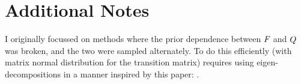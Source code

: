 \documentclass[a4paper,10pt]{article}
\begin{document}
\section{Additional Notes}

I originally focussed on methods where the prior dependence between $F_{}$ and $Q_{}$ was broken, and the two were sampled alternately. To do this efficiently (with matrix normal distribution for the transition matrix) requires using eigen-decompositions in a manner inspired by this paper: \cite{Stegle2011}.




\appendix




\end{document}
